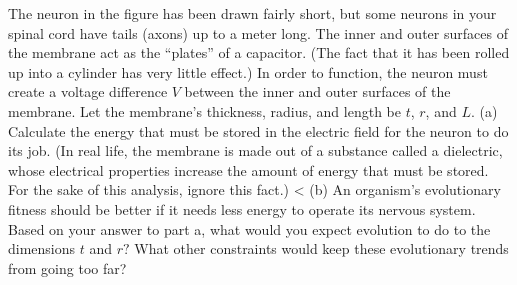 The neuron in the figure has been drawn fairly short, but
some neurons in your spinal cord have tails (axons) up to a
meter long. The inner and outer surfaces of the membrane act
as the ``plates'' of a capacitor. (The fact that it has been
rolled up into a cylinder has very little effect.) In order
to function, the neuron must create a voltage difference $V$
between the inner and outer surfaces of the membrane. Let
the membrane's thickness, radius, and length be $t$, $r$, and $L$.
(a) Calculate the energy that must be stored in the electric
field for the neuron to do its job. (In real life, the
membrane is made out of a substance called a dielectric,
whose electrical properties increase the amount of energy
that must be stored. For the sake of this analysis, ignore
this fact.)
<%
(b) An organism's evolutionary fitness should be better if
it needs less energy to operate its nervous system. Based on
your answer to part a, what would you expect evolution to
do to the dimensions $t$ and $r?$ What other constraints
would keep these evolutionary trends from going too far?
